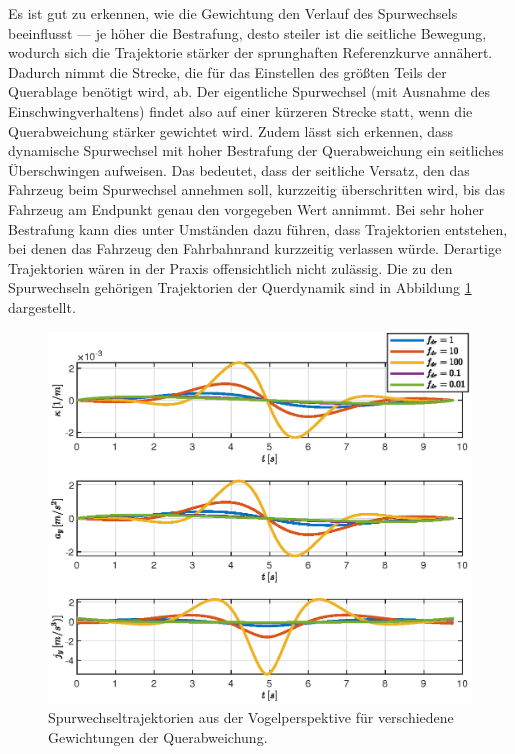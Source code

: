Es ist gut zu erkennen, wie die Gewichtung den Verlauf des Spurwechsels beeinflusst --- je höher die Bestrafung, desto steiler ist die seitliche Bewegung, wodurch sich die Trajektorie stärker der sprunghaften Referenzkurve annähert. Dadurch nimmt die Strecke, die für das Einstellen des größten Teils der Querablage benötigt wird, ab. Der eigentliche Spurwechsel (mit Ausnahme des Einschwingverhaltens) findet also auf einer kürzeren Strecke statt, wenn die Querabweichung stärker gewichtet wird. Zudem lässt sich erkennen, dass dynamische Spurwechsel mit hoher Bestrafung der Querabweichung ein seitliches Überschwingen aufweisen. Das bedeutet, dass der seitliche Versatz, den das Fahrzeug beim Spurwechsel annehmen soll, kurzzeitig überschritten wird, bis das Fahrzeug am Endpunkt genau den vorgegeben Wert annimmt. Bei sehr hoher Bestrafung kann dies unter Umständen dazu führen, dass Trajektorien entstehen, bei denen das Fahrzeug den Fahrbahnrand kurzzeitig verlassen würde. Derartige Trajektorien wären in der Praxis offensichtlich nicht zulässig. Die zu den Spurwechseln gehörigen Trajektorien der Querdynamik sind in Abbildung \ref{fig:lat_dyn_fdr_var} dargestellt.
\begin{figure}[h] 
	\centering
	\includegraphics[width=\linewidth]{./Bilder/Ergebnisse/Geradeausfahrt/Spurwechsel/fdr_var/lat_dyn_ohne_kappa.eps}
	\caption{Spurwechseltrajektorien aus der Vogelperspektive für verschiedene Gewichtungen der Querabweichung.}
	\label{fig:lat_dyn_fdr_var}
\end{figure} 
